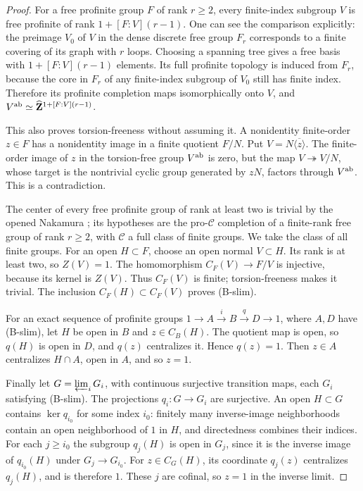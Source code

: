 \documentclass[11pt,a4paper]{article}
\begin{document}
\begin{proof}
For a free profinite group $F$ of rank $r\ge2$, every finite-index subgroup
$V$ is free profinite of rank $1+[F:V](r-1)$. One can see the comparison
explicitly: the preimage $V_0$ of $V$ in the dense discrete free group
$F_r$ corresponds to a finite covering of its graph with $r$ loops.
Choosing a spanning tree gives a free basis with
$1+[F:V](r-1)$ elements. Its full profinite topology is induced from $F_r$,
because the core in $F_r$ of any finite-index subgroup of $V_0$ still has
finite index. Therefore its profinite completion maps isomorphically onto
$V$, and $V^{\rm ab}\simeq\widehat{\mathbf Z}^{1+[F:V](r-1)}$.

This also proves torsion-freeness without assuming it. A nonidentity
finite-order $z\in F$ has a nonidentity image in a finite quotient $F/N$.
Put $V=N\overline{\langle z\rangle}$. The finite-order image of $z$ in
the torsion-free group $V^{\rm ab}$ is zero, but the map
$V\twoheadrightarrow V/N$, whose target is the nontrivial cyclic group
generated by $zN$, factors through $V^{\rm ab}$. This is a contradiction.

The center of every free profinite group of rank at least two is trivial
by the opened Nakamura \cite[Corollary (1.3.4)]{B_Nakamura1994}; its
hypotheses are the pro-$\mathcal C$ completion of a finite-rank free group
of rank $r\ge2$, with $\mathcal C$ a full class of finite groups. We take
the class of all finite groups. For an open $H\subset F$, choose an open
normal $V\subset H$. Its rank is at least two, so $Z(V)=1$.
The homomorphism $C_F(V)\to F/V$ is injective, because its kernel is
$Z(V)$. Thus $C_F(V)$ is finite; torsion-freeness makes it trivial.
The inclusion $C_F(H)\subset C_F(V)$ proves (B-slim).

For an exact sequence of profinite groups
$1\to A\xrightarrow{i}B\xrightarrow{q}D\to1$, where $A,D$ have
(B-slim), let $H$ be open in $B$ and $z\in C_B(H)$. The quotient map is
open, so $q(H)$ is open in $D$, and $q(z)$ centralizes it. Hence $q(z)=1$.
Then $z\in A$ centralizes $H\cap A$, open in $A$, and so $z=1$.

Finally let $G=\varprojlim_iG_i$, with continuous surjective transition
maps, each $G_i$ satisfying (B-slim). The projections $q_i:G\to G_i$
are surjective. An open $H\subset G$ contains $\ker q_{i_0}$ for some
index $i_0$: finitely many inverse-image neighborhoods contain an open
neighborhood of $1$ in $H$, and directedness combines their indices.
For each $j\ge i_0$ the subgroup $q_j(H)$ is open in $G_j$, since it is
the inverse image of $q_{i_0}(H)$ under $G_j\to G_{i_0}$.
For $z\in C_G(H)$, its coordinate $q_j(z)$ centralizes $q_j(H)$, and is
therefore $1$. These $j$ are cofinal, so $z=1$ in the inverse limit.
\end{proof}
\end{document}
